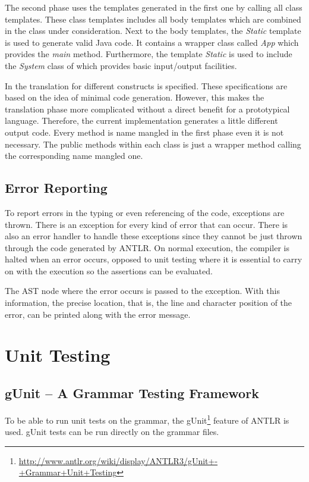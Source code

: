 The second phase uses the templates generated in the first one by calling
all class templates. These class templates includes all body templates
which are combined in the class under consideration. Next to the body templates,
the \emph{Static} template is used to generate valid Java code. It contains
a wrapper class called \emph{App} which provides the \emph{main} method.
Furthermore, the template \emph{Static} is used to include the \emph{System}
class of \ooplss which provides basic input/output facilities.

In  the translation for different constructs
is specified. These specifications are based on the idea of minimal code
generation. However, this makes the translation phase more complicated without
a direct benefit for a prototypical language. Therefore, the current implementation
generates a little different output code. Every method is name mangled in the
first phase even it is not necessary. The public methods within each class is
just a wrapper method calling the corresponding name mangled one.

\subsection{Error Reporting}
To report errors in the typing or even referencing of the code, exceptions
are thrown. There is an exception for every kind of error that can occur.
There is also an error handler to handle these exceptions since they cannot
be just thrown through the code generated by ANTLR. On normal execution,
the compiler is halted when an error occurs, opposed to unit testing where
it is essential to carry on with the execution so the assertions can be
evaluated.

The AST node where the error occurs is passed to the exception. With this
information, the precise location, that is, the line and character position
of the error, can be printed along with the error message.

\section{Unit Testing}
\subsection{gUnit -- A Grammar Testing Framework}

To be able to run unit tests on the grammar, the gUnit\footnote{
\href{http://www.antlr.org/wiki/display/ANTLR3/gUnit+-+Grammar+Unit+Testing}
{http://www.antlr.org/wiki/display/ANTLR3/gUnit+-+Grammar+Unit+Testing}}
feature of ANTLR is used. gUnit tests can be run directly on the grammar files.

